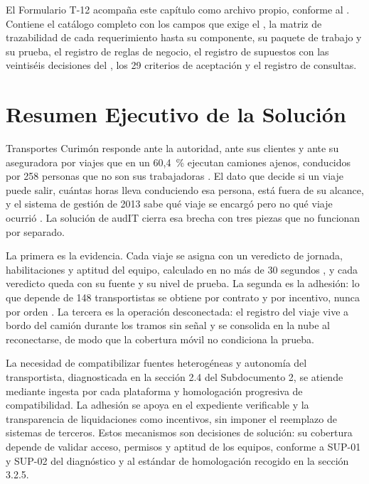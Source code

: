 El Formulario T-12 acompaña este capítulo como archivo propio, conforme al . Contiene el catálogo completo con los campos que exige el
, la matriz de trazabilidad de cada requerimiento hasta su componente, su
paquete de trabajo y su prueba, el registro de reglas de negocio, el registro de supuestos con las
veintiséis decisiones del , los 29 criterios de aceptación y el registro de
consultas.

\section{Resumen Ejecutivo de la Solución}\label{sec:3-resumen-ejecutivo}

Transportes Curimón responde ante la autoridad, ante sus clientes y ante su aseguradora por viajes que
en un 60,4~\% ejecutan camiones ajenos, conducidos por 258 personas que no son sus trabajadoras
. El dato que decide si un viaje puede salir, cuántas horas lleva conduciendo esa
persona, está fuera de su alcance, y el sistema de gestión de 2013 sabe qué viaje se encargó pero no
qué viaje ocurrió . La solución de audIT cierra esa brecha con tres piezas que no
funcionan por separado.

La primera es la evidencia. Cada viaje se asigna con un veredicto de jornada, habilitaciones y aptitud
del equipo, calculado en no más de 30 segundos , y cada veredicto queda con su
fuente y su nivel de prueba. La segunda es la adhesión: lo que depende de 148 transportistas se obtiene
por contrato y por incentivo, nunca por orden . La tercera es la
operación desconectada: el registro del viaje vive a bordo del camión durante los tramos sin señal y se
consolida en la nube al reconectarse, de modo que la cobertura móvil no condiciona la prueba.

La necesidad de compatibilizar fuentes heterogéneas y autonomía del transportista, diagnosticada en la sección 2.4 del Subdocumento 2, se atiende mediante ingesta por cada plataforma y homologación progresiva de compatibilidad. La adhesión se apoya en el expediente verificable y la transparencia de liquidaciones como incentivos, sin imponer el reemplazo de sistemas de terceros. Estos mecanismos son decisiones de solución: su cobertura depende de validar acceso, permisos y aptitud de los equipos, conforme a SUP-01 y SUP-02 del diagnóstico y al estándar de homologación recogido en la sección 3.2.5.

